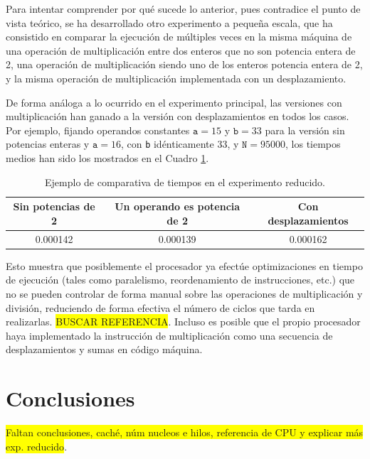 \documentclass[11pt,a4paper,twoside]{article}
\theoremstyle{definition}
\begin{document}
	Para intentar comprender por qué sucede lo anterior, pues contradice el punto de vista teórico, se ha desarrollado otro experimento a pequeña escala, que ha consistido en comparar la ejecución de múltiples veces en la misma máquina de una operación de multiplicación entre dos enteros que no son potencia entera de 2, una operación de multiplicación siendo uno de los enteros potencia entera de 2, y la misma operación de multiplicación implementada con un desplazamiento. 
	
	De forma análoga a lo ocurrido en el experimento principal, las versiones con multiplicación han ganado a la versión con desplazamientos en todos los casos. Por ejemplo, fijando operandos constantes $\texttt{a}=15$ y $\texttt{b}=33$ para la versión sin potencias enteras y $\texttt{a}=16$, con \texttt{b} idénticamente 33, y $\texttt{N}=95000$, los tiempos medios han sido los mostrados en el Cuadro \ref{tabla1}.
	
	\begin{table} [H] \centering
		\begin{tabular} {| c | c | c |}
			\hline
			\textbf{Sin potencias de 2} & \textbf{Un operando es potencia de 2} & \textbf{Con desplazamientos} \\
			\hline
			 0.000142 & 0.000139 & 0.000162 \\
			 \hline
		\end{tabular}
		\caption{Ejemplo de comparativa de tiempos en el experimento reducido.}
		\label{tabla1}
	\end{table} 
	
	Esto muestra que posiblemente el procesador ya efectúe optimizaciones en tiempo de ejecución (tales como paralelismo, reordenamiento de instrucciones, etc.) que no se pueden controlar de forma manual sobre las operaciones de multiplicación y división, reduciendo de forma efectiva el número de ciclos que tarda en realizarlas. \colorbox{yellow}{BUSCAR REFERENCIA}. Incluso es posible que el propio procesador haya implementado la instrucción de multiplicación como una secuencia de desplazamientos y sumas en código máquina.
	
	\section{Conclusiones}
	
	\colorbox{yellow}{Faltan conclusiones, caché, núm nucleos e hilos, referencia de CPU y explicar más exp. reducido}.


\newpage
\thispagestyle{empty}




\printbibliography
	
	
	
\end{document}
